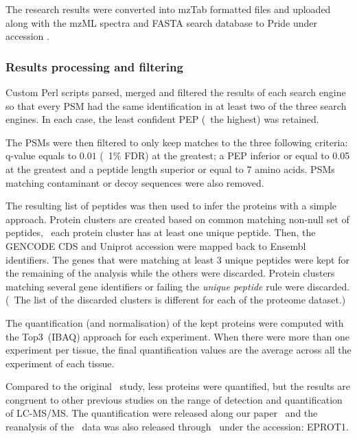 The research results were converted into mzTab formatted files and uploaded along
with the mzML spectra and FASTA search database to \gls{Pride}
under accession .

\subsubsection{Results processing and filtering}\label{subsub:resultsFiltering}

Custom Perl scripts parsed, merged and filtered the results of each search engine
so that every \gls{PSM} had the same identification in at least two of the three
search engines.
In each case, the least confident \gls{PEP} (\ie\ the highest) was retained.

The \glspl{PSM} were then filtered to only keep matches to the three following
criteria:
\gls{q-value} equals to $0.01$ (\ie\ 1\% \gls{FDR}) at the greatest; %
a \gls{PEP} inferior or equal to 0.05 at the greatest and
a peptide length superior or equal to 7 amino acids.
\glspl{PSM} matching contaminant or decoy sequences were also removed.

The resulting list of peptides was then used to infer the proteins with
a simple approach.
Protein clusters are created based on common matching non-null set of peptides,
\ie\ each protein cluster has at least one unique peptide.
Then, the \gls{GENCODE} \gls{CDS} and \gls{Uniprot} accession were mapped back to
\gls{Ensembl} identifiers.
The genes that were matching at least 3 unique peptides were kept for the
remaining of the analysis while the others were discarded. Protein clusters
matching several gene identifiers or failing the \emph{unique peptide} rule were
discarded. (\NB\ The list of the discarded clusters is different for each of the
proteome dataset.)

The quantification (and normalisation) of the kept proteins were computed
with the Top3~(\gls{IBAQ}) approach for each experiment.
When there were more than one experiment per tissue, the final quantification
values are the average across all the experiment of each tissue.

Compared to the original \pandey\ study, less proteins were quantified, but
the results are congruent to other previous studies on the range of detection
and quantification of \gls{LC-MS/MS}. The quantification were released along
our paper~ and the reanalysis of the \pandey\ data was
also released through \egxa\ under the accession: E\textminus{}PROT\textminus{}1.

